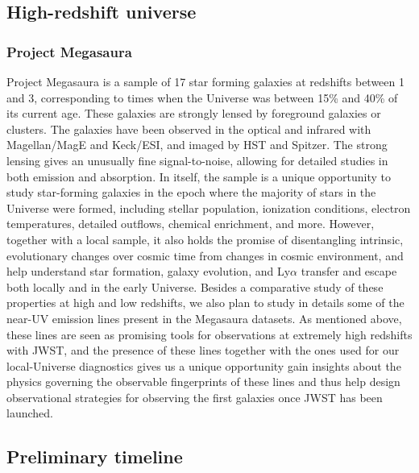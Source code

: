 \documentclass[12pt, a4paper]{scrartcl}
\begin{document}
\subsection*{High-redshift universe}

\subsubsection*{Project Megasaura} 

Project Megasaura is a sample of 17 star forming galaxies at redshifts between
1 and 3, corresponding to times when the Universe was between 15\% and 40\% of
its current age. These galaxies are strongly lensed by foreground galaxies or
clusters. The galaxies have been observed in the optical and infrared with
Magellan/MagE and Keck/ESI, and imaged by HST and Spitzer. The strong lensing
gives an unusually fine signal-to-noise, allowing for detailed studies in both
emission and absorption.  In itself, the sample is a unique opportunity to study
star-forming galaxies in the epoch where the majority of stars in the Universe
were formed, including stellar population, ionization conditions, electron
temperatures, detailed outflows, chemical enrichment, and more. However,
together with a local sample, it also holds the promise of disentangling
intrinsic, evolutionary changes over cosmic time from changes in cosmic
environment, and help understand star formation, galaxy evolution, and
Ly$\alpha$ transfer and escape both locally and in the early Universe.
Besides a comparative study of these properties at high and low redshifts, we
also plan to study in details some of the near-UV emission lines present in the
Megasaura datasets. As mentioned above, these lines are seen as promising tools
for observations at extremely high redshifts with JWST, and the presence of
these lines together with the ones used for our local-Universe diagnostics gives
us a unique opportunity gain insights about the physics governing the observable
fingerprints of these lines and thus help design observational strategies for
observing the first galaxies once JWST has been launched.

\subsection*{Preliminary timeline}
\end{document}
